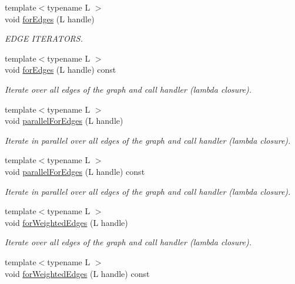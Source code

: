 \begin{DoxyCompactItemize}
{\footnotesize template$<$typename L $>$ }\\void \hyperlink{class_networ_kit_1_1_graph_a23a817e845887e6d2be9b42180448282}{for\-Edges} (L handle)
\begin{DoxyCompactList}\small\item\em E\-D\-G\-E I\-T\-E\-R\-A\-T\-O\-R\-S. \end{DoxyCompactList}\item 
{\footnotesize template$<$typename L $>$ }\\void \hyperlink{class_networ_kit_1_1_graph_a664cd528e003b9d530b9844412c9c243}{for\-Edges} (L handle) const 
\begin{DoxyCompactList}\small\item\em Iterate over all edges of the graph and call handler (lambda closure). \end{DoxyCompactList}\item 
{\footnotesize template$<$typename L $>$ }\\void \hyperlink{class_networ_kit_1_1_graph_a22c0e86e32fa99bb6f883bc63c42134a}{parallel\-For\-Edges} (L handle)
\begin{DoxyCompactList}\small\item\em Iterate in parallel over all edges of the graph and call handler (lambda closure). \end{DoxyCompactList}\item 
{\footnotesize template$<$typename L $>$ }\\void \hyperlink{class_networ_kit_1_1_graph_a107e9f9e74bee51de04b20fd8577db48}{parallel\-For\-Edges} (L handle) const 
\begin{DoxyCompactList}\small\item\em Iterate in parallel over all edges of the graph and call handler (lambda closure). \end{DoxyCompactList}\item 
{\footnotesize template$<$typename L $>$ }\\void \hyperlink{class_networ_kit_1_1_graph_a5cfc35c769c1edc8805aa9b93ac096cf}{for\-Weighted\-Edges} (L handle)
\begin{DoxyCompactList}\small\item\em Iterate over all edges of the graph and call handler (lambda closure). \end{DoxyCompactList}\item 
{\footnotesize template$<$typename L $>$ }\\void \hyperlink{class_networ_kit_1_1_graph_a561e122e5eec4a7a5fb6867fc01b6dec}{for\-Weighted\-Edges} (L handle) const 

\end{DoxyCompactItemize}
